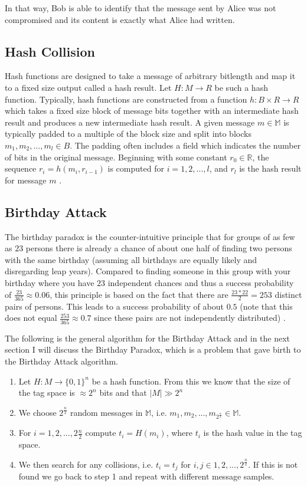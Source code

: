 \documentclass[12pt]{article}
\begin{document}
In that way, Bob is able to identify that the message sent by Alice was not compromised and its content
is exactly what Alice had written.

\subsection{Hash Collision}

Hash functions are designed to take a message of arbitrary bitlength and map it to a fixed size
output called a hash result. Let \(H : M \to R\) be such a hash function. Typically, 
hash functions are constructed from a function \(h: B \times R \to R\) which takes a fixed size block 
of message bits together with an intermediate hash result and produces a new intermediate hash result. 
A given message \(m \in \mathbb{M}\) is typically padded to a multiple of the block size and split 
into blocks \(m_1, m_2, ... , m_l \in B\). The padding often includes a field which indicates the 
number of bits in the original message. Beginning with some constant \(r_0 \in \mathbb{R}\), the sequence 
\(r_i = h(m_i, r_{i-1})\) is computed for \(i = 1, 2, ... , l\), and \(r_l\) is the hash result for message 
\(m\) \cite{van1999parallel}.

\subsection{Birthday Attack}

The birthday paradox is the counter-intuitive principle that for
groups of as few as \(23\) persons there is already a chance of about one half of finding two 
persons with the same birthday (assuming all birthdays are equally likely and disregarding 
leap years). Compared to finding someone in this group with your birthday where you have 
\(23\) independent chances and thus a success probability of \(\frac{23}{365} \approx 0.06\), this principle is 
based on the fact that there are \(\frac{23 * 22}{2} = 253\) distinct pairs of persons. This leads to 
a success probability of about \(0.5\) (note that this does not equal \(\frac{253}{365} \approx 0.7\) since these 
pairs are not independently distributed) \cite{stevens2012attacks}.

The following is the general algorithm for the Birthday Attack and in the next section I will discuss
the Birthday Paradox, which is a problem that gave birth to the Birthday Attack algorithm.
\begin{enumerate}
\item Let \(H : M \to \{0,1\}^n\) be a hash function. From this we know that the size of the tag space is \(\approx 2^n\) bits
and that \(| M | \gg 2^n\)
\item We choose \(2^\frac{n}{2}\) random messages in \(\mathbb{M}\), i.e. \(m_1, m_2, ... , m_{2^\frac{n}{2}} \in \mathbb{M}\).
\item For \(i = 1,2, ... , 2\frac{n}{2}\) compute \(t_i = H(m_i)\), where \(t_i\) is the hash value in the tag space.
\item We then search for any collisions, i.e. \(t_i = t_j\) for \(i, j \in {1, 2, ... , 2^\frac{n}{2}}\). If this is not
found we go back to step 1 and repeat with different message samples.
\end{enumerate}
\end{document}
